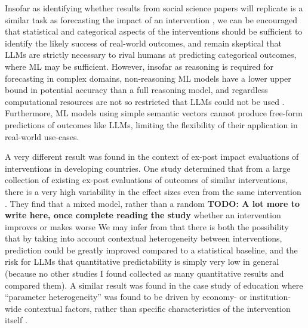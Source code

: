 \documentclass[12pt,a4paper]{article}
\begin{document}
Insofar as identifying whether results from social science papers will replicate is a similar task as forecasting the impact of an intervention \ABSTRACT, we can be encouraged that statistical and categorical aspects of the interventions should be sufficient to identify the likely success of real-world outcomes, and remain skeptical that LLMs are strictly necessary to rival humans at predicting categorical outcomes, where ML may be sufficient. However, insofar as reasoning is required for forecasting in complex domains, non-reasoning ML models have a lower upper bound in potential accuracy than a full reasoning model, and regardless computational resources are not so restricted that LLMs could not be used \ABSTRACT. Furthermore, ML models using simple semantic vectors cannot produce free-form predictions of outcomes like LLMs, limiting the flexibility of their application in real-world use-cases.

A very different result was found in the context of ex-post impact evaluations of interventions in developing countries. One study determined that from a large collection of existing ex-post evaluations of outcomes of similar interventions, there is a very high variability in the effect sizes even from the same intervention . They find that a mixed model, rather than a random \textbf{TODO: A lot more to write here, once complete reading the study} whether an intervention improves or makes worse  %
We may infer from  that there is both the possibility that by taking into account contextual heterogeneity between interventions, prediction could be greatly improved compared to a statistical baseline, and the risk for LLMs that quantitative predictability is simply very low in general (because no other studies I found collected as many quantitative results and compared them). A similar result was found in the case study of education where ``parameter heterogeneity'' was found to be driven by economy- or institution-wide contextual factors, rather than specific characteristics of the intervention itself .
\end{document}
